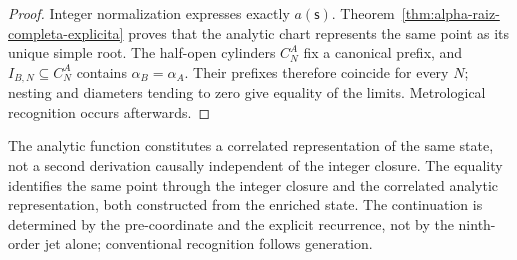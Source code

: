 \begin{proof}
Integer normalization expresses exactly \(a(\mathsf s)\).
Theorem~\ref{thm:alpha-raiz-completa-explicita} proves that the analytic
chart represents the same point as its unique simple root. The half-open
cylinders \(C_N^A\) fix a canonical prefix, and
\(I_{B,N}\subseteq C_N^A\) contains \(\alpha_B=\alpha_A\). Their prefixes
therefore coincide for every \(N\); nesting and diameters tending to zero
give equality of the limits. Metrological recognition occurs
afterwards.
\end{proof}

The analytic function constitutes a correlated representation of the same
state, not a second derivation causally independent of the integer closure.
The equality identifies the same point through the integer closure and the
correlated analytic representation, both constructed from the enriched
state. The continuation is determined by the pre-coordinate and the
explicit recurrence, not by the ninth-order jet alone; conventional
recognition follows generation.

